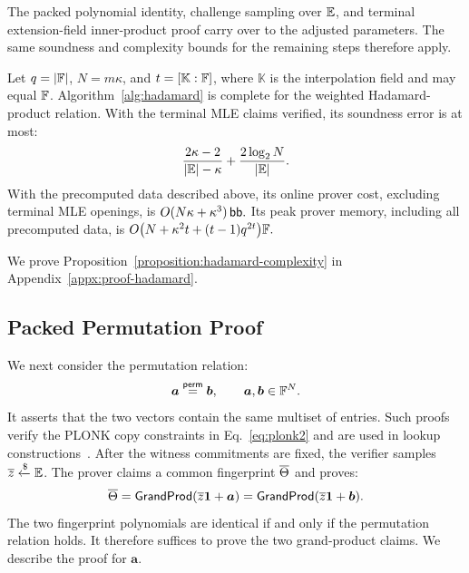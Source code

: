 The packed polynomial identity, challenge sampling over
\(\mathbb{E}\), and terminal extension-field inner-product
proof carry over to the adjusted parameters.
The same soundness and complexity bounds for the
remaining steps therefore apply.

\begin{proposition}
\label{proposition:hadamard-complexity}
Let \(q=|{\mathbb{F}}|\), \(N=m\kappa\), and
\(t=[\mathbb K:{\mathbb{F}}]\), where \(\mathbb K\) is the
interpolation field and may equal \({\mathbb{F}}\).
Algorithm~\ref{alg:hadamard} is complete for the weighted
Hadamard-product relation.
With the terminal MLE claims verified, its soundness error
is at most:
\[
    \frac{2\kappa-2}{|\mathbb{E}|-\kappa}
    +
    \frac{2\log_2N}{|\mathbb{E}|}.
\]
With the precomputed data described above, its online
prover cost, excluding terminal MLE openings, is
\(
    O(N\kappa+\kappa^3)\,\mathsf{bb}.
\)
Its peak prover memory, including all precomputed data, is
\(
    O\bigl(N+\kappa^2t+(t-1)q^{2t}\bigr) {\mathbb{F}}.
\)
\end{proposition}

We prove Proposition~\ref{proposition:hadamard-complexity} in
Appendix~\ref{appx:proof-hadamard}.



\subsection{Packed Permutation Proof}
\label{sec:permutation}

We next consider the permutation relation:
\[
    \bm a\stackrel{\mathsf{perm}}{=}\bm b,
    \qquad
    \bm a,\bm b\in{\mathbb{F}}^N.
\]
It asserts that the two vectors contain the same multiset of
entries. Such proofs verify the PLONK copy constraints in
Eq.~\eqref{eq:plonk2} and are used in lookup
constructions~\cite{eurocrypt/SettyTW24}.
After the witness commitments are fixed, the verifier samples
\(\overline{z}\mathrel{\xleftarrow{\$}}\mathbb{E}\). The prover claims a common
fingerprint \(\overline{\Theta}\) and proves:
\begin{equation}
    \overline{\Theta}
    =\mathsf{GrandProd}(\overline{z}\bm1+\bm a)
    =\mathsf{GrandProd}(\overline{z}\bm1+\bm b).
\label{eq:packed-permutation-fingerprint}
\end{equation}
The two fingerprint polynomials are identical if and only if
the permutation relation holds. It therefore suffices to prove
the two grand-product claims. We describe the proof for \(\bm a\).

